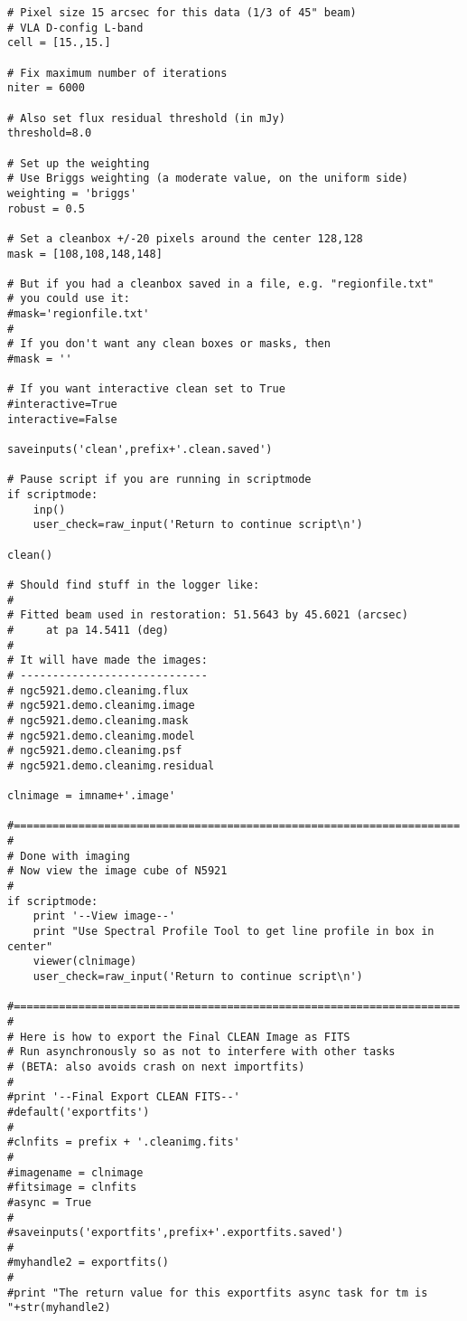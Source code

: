 \begin{verbatim}
# Pixel size 15 arcsec for this data (1/3 of 45" beam)
# VLA D-config L-band
cell = [15.,15.]

# Fix maximum number of iterations
niter = 6000

# Also set flux residual threshold (in mJy)
threshold=8.0

# Set up the weighting
# Use Briggs weighting (a moderate value, on the uniform side)
weighting = 'briggs'
robust = 0.5

# Set a cleanbox +/-20 pixels around the center 128,128
mask = [108,108,148,148]

# But if you had a cleanbox saved in a file, e.g. "regionfile.txt"
# you could use it:
#mask='regionfile.txt'
#
# If you don't want any clean boxes or masks, then
#mask = ''

# If you want interactive clean set to True
#interactive=True
interactive=False

saveinputs('clean',prefix+'.clean.saved')

# Pause script if you are running in scriptmode
if scriptmode:
    inp()
    user_check=raw_input('Return to continue script\n')

clean()

# Should find stuff in the logger like:
#
# Fitted beam used in restoration: 51.5643 by 45.6021 (arcsec)
#     at pa 14.5411 (deg)
#
# It will have made the images:
# -----------------------------
# ngc5921.demo.cleanimg.flux
# ngc5921.demo.cleanimg.image
# ngc5921.demo.cleanimg.mask
# ngc5921.demo.cleanimg.model
# ngc5921.demo.cleanimg.psf
# ngc5921.demo.cleanimg.residual

clnimage = imname+'.image'

#=====================================================================
#
# Done with imaging
# Now view the image cube of N5921
#
if scriptmode:
    print '--View image--'
    print "Use Spectral Profile Tool to get line profile in box in center"
    viewer(clnimage)
    user_check=raw_input('Return to continue script\n')

#=====================================================================
#
# Here is how to export the Final CLEAN Image as FITS
# Run asynchronously so as not to interfere with other tasks
# (BETA: also avoids crash on next importfits)
#
#print '--Final Export CLEAN FITS--'
#default('exportfits')
#
#clnfits = prefix + '.cleanimg.fits'
#
#imagename = clnimage
#fitsimage = clnfits
#async = True
#
#saveinputs('exportfits',prefix+'.exportfits.saved')
#
#myhandle2 = exportfits()
#
#print "The return value for this exportfits async task for tm is "+str(myhandle2)


\end{verbatim}
